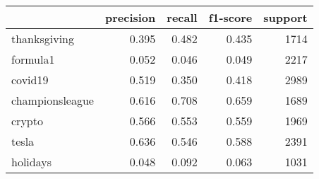 \begin{tabular}{lrrrr}
\toprule
{} &  precision &  recall &  f1-score &  support \\
\midrule
thanksgiving    &      0.395 &   0.482 &     0.435 &     1714 \\
formula1        &      0.052 &   0.046 &     0.049 &     2217 \\
covid19         &      0.519 &   0.350 &     0.418 &     2989 \\
championsleague &      0.616 &   0.708 &     0.659 &     1689 \\
crypto          &      0.566 &   0.553 &     0.559 &     1969 \\
tesla           &      0.636 &   0.546 &     0.588 &     2391 \\
holidays        &      0.048 &   0.092 &     0.063 &     1031 \\
\bottomrule
\end{tabular}
